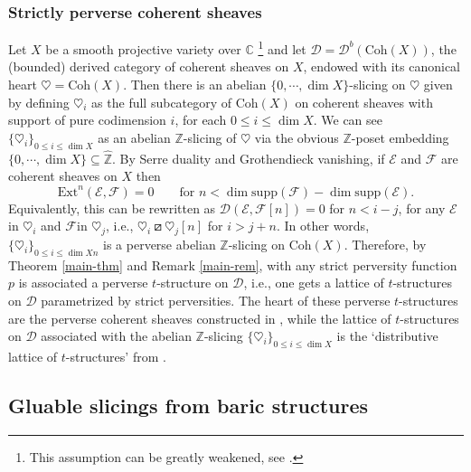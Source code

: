\documentclass{article}
\theoremstyle{definition}
\newcommand{\Z}{\mathbb{Z}}
\newcommand{\orth}{\boxslash}
\begin{document}
\subsubsection{Strictly perverse coherent sheaves}\label{perverse-coherent}

 Let $X$ be a smooth projective variety over $\mathbb{C}$ \footnote{This assumption can be greatly weakened, see \cite{bezr}.} and let $\mathscr{D} = \mathscr{D}^b(\textrm{Coh}(X))$, the (bounded) derived category of coherent sheaves on $X$, endowed with its canonical heart $\heartsuit = \textrm{Coh}(X)$. Then there is an abelian $\{0, \cdots , \dim X \}$-slicing on $\heartsuit$ given by defining $\heartsuit_i$ as the full subcategory of $\textrm{Coh}(X)$ on coherent sheaves with support of pure codimension $i$, for each $0 \leq i \leq \dim X$. 
 We can see $\{\heartsuit_i\}_{0\leq i\leq \dim X}$ as an abelian $\Z$-slicing of $\heartsuit$ via the obvious $\Z$-poset embedding $\{0, \cdots , \dim X \} \subseteq \hat{\Z}$. By Serre duality and Grothendieck vanishing, if $\mathscr{E}$ and $\mathscr{F}$ are coherent sheaves on $X$ then
 \[
 \mathrm{Ext}^n(\mathscr{E},\mathscr{F})=0\qquad \text{for } n<\dim \mathrm{supp}(\mathscr{F})-\dim\mathrm{supp}(\mathscr{E}).
 \]
  Equivalently, this can be rewritten as $\mathscr{D}(\mathscr{E},\mathscr{F}[n])=0$ for $n<i-j$, for any $\mathscr{E}$ in $\heartsuit_i$ and $\mathscr{F}$in $\heartsuit_j$, i.e., 
 $\heartsuit_{i}\orth\heartsuit_{j}[n]$ for $i>j+n$. In other words, $\{\heartsuit_i\}_{0\leq i\leq \dim Xn}$ is a perverse abelian $\Z$-slicing on $\textrm{Coh}(X)$. Therefore, by Theorem \ref{main-thm} and Remark \ref{main-rem}, with any strict perversity function $p$ is associated a perverse $t$-structure on  $\mathscr{D}$, i.e., one gets a lattice of $t$-structures on  $\mathscr{D}$ parametrized by strict perversities. The heart of these perverse $t$-structures are the perverse coherent sheaves constructed in  \cite{bezr}, while the lattice of $t$-structures on $\mathscr{D}$ associated with the abelian $\Z$-slicing $\{\heartsuit_i\}_{0\leq i\leq \dim X}$ is the `distributive lattice of $t$-structures' from \cite{bondper}.
 

\subsection{Gluable slicings from baric structures}\label{baric}
\end{document}
